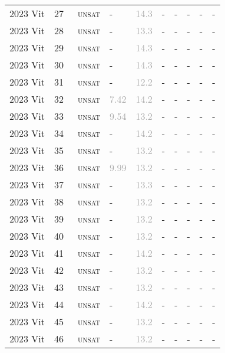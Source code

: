 \begin{center}
{\begin{longtable}{@{}llllllllll@{}}
2023 Vit & 27 & ~\textsc{unsat} & - & \textcolor{darkgray}{14.3} & - & - & - & - & - \\
2023 Vit & 28 & ~\textsc{unsat} & - & \textcolor{darkgray}{13.3} & - & - & - & - & - \\
2023 Vit & 29 & ~\textsc{unsat} & - & \textcolor{darkgray}{14.3} & - & - & - & - & - \\
2023 Vit & 30 & ~\textsc{unsat} & - & \textcolor{darkgray}{14.3} & - & - & - & - & - \\
2023 Vit & 31 & ~\textsc{unsat} & - & \textcolor{darkgray}{12.2} & - & - & - & - & - \\
2023 Vit & 32 & ~\textsc{unsat} & \textcolor{darkgray}{7.42} & \textcolor{darkgray}{14.2} & - & - & - & - & - \\
2023 Vit & 33 & ~\textsc{unsat} & \textcolor{darkgray}{9.54} & \textcolor{darkgray}{13.2} & - & - & - & - & - \\
2023 Vit & 34 & ~\textsc{unsat} & - & \textcolor{darkgray}{14.2} & - & - & - & - & - \\
2023 Vit & 35 & ~\textsc{unsat} & - & \textcolor{darkgray}{13.2} & - & - & - & - & - \\
2023 Vit & 36 & ~\textsc{unsat} & \textcolor{darkgray}{9.99} & \textcolor{darkgray}{13.2} & - & - & - & - & - \\
2023 Vit & 37 & ~\textsc{unsat} & - & \textcolor{darkgray}{13.3} & - & - & - & - & - \\
2023 Vit & 38 & ~\textsc{unsat} & - & \textcolor{darkgray}{13.2} & - & - & - & - & - \\
2023 Vit & 39 & ~\textsc{unsat} & - & \textcolor{darkgray}{13.2} & - & - & - & - & - \\
2023 Vit & 40 & ~\textsc{unsat} & - & \textcolor{darkgray}{13.2} & - & - & - & - & - \\
2023 Vit & 41 & ~\textsc{unsat} & - & \textcolor{darkgray}{14.2} & - & - & - & - & - \\
2023 Vit & 42 & ~\textsc{unsat} & - & \textcolor{darkgray}{13.2} & - & - & - & - & - \\
2023 Vit & 43 & ~\textsc{unsat} & - & \textcolor{darkgray}{13.2} & - & - & - & - & - \\
2023 Vit & 44 & ~\textsc{unsat} & - & \textcolor{darkgray}{14.2} & - & - & - & - & - \\
2023 Vit & 45 & ~\textsc{unsat} & - & \textcolor{darkgray}{13.2} & - & - & - & - & - \\
2023 Vit & 46 & ~\textsc{unsat} & - & \textcolor{darkgray}{13.2} & - & - & - & - & - \\

\end{longtable}}
\end{center}
